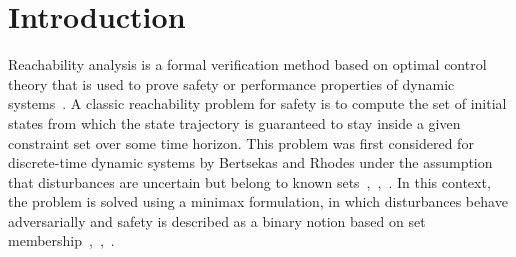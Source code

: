 \documentclass[letterpaper, 10 pt, conference]{ieeeconf}  %
\begin{document}


\section{Introduction}
\label{sec:introduction}
Reachability analysis is a formal verification method based on optimal control theory that is used to prove 
safety or performance properties of dynamic systems~\cite{bansal2017hamilton}.
A classic reachability problem for safety is to compute the set of initial states from which 
the state trajectory is guaranteed to stay inside a given constraint set over some time horizon.
This problem was first considered for discrete-time dynamic systems by Bertsekas and Rhodes 
under the assumption that disturbances are uncertain but belong to known sets~\cite{bertsekas1971control},~\cite{bertsekas1971minimax},~\cite{bertsekas2005dynamic}.
In this context, the problem is solved using a minimax formulation,
in which disturbances behave adversarially and safety is described as a binary notion based on set membership~\cite{bertsekas1971control},~\cite{bertsekas1971minimax},~\cite{bertsekas2005dynamic}.\footnotemark 
{}
\end{document}
